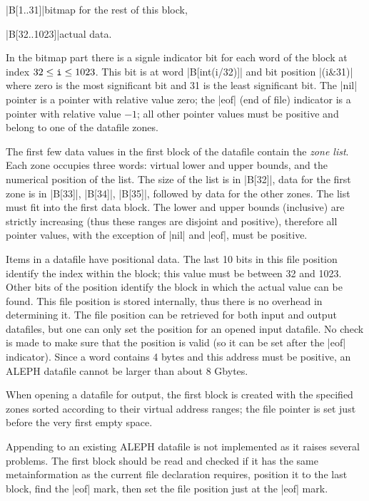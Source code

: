 \documentclass[titlepage]{article}
\newcommand\A{\textsf{ALEPH}}
\begin{document}
\HH\pp|B[1..31]|\HE bitmap for the rest of this block,

\HH\pp|B[32..1023]|\HE actual data.

\smallskip

\noindent
In the bitmap part there is a signle indicator bit for each word of the
block at index
$32\le \mbox{\tt i} \le 1023$. This bit is at word \pp|B[int(i/32)]| and
bit position \pp|(i\&31)| where zero is the most significant bit and 31 is the
least significant bit. The \pp|nil| pointer is a pointer with relative value
zero; the \pp|eof| (end of file) indicator is a pointer with relative value
$-1$; all other pointer values must be positive and belong to one of the
datafile zones.

The first few data values in the first block of the datafile contain the
\emph{zone list}. Each zone occupies three words: virtual lower and upper
bounds, and the numerical position of the list. The size of the list is in
\pp|B[32]|, data for the first zone is in \pp|B[33]|, \pp|B[34]|,
\pp|B[35]|, followed by data for the other zones. The list must fit into the
first data block. The lower and upper bounds (inclusive) are strictly
increasing (thus these ranges are disjoint and positive), therefore all
pointer values, with the exception of \pp|nil| and \pp|eof|, must be
positive.

Items in a datafile have positional data. The last 10 bits in this
file position identify the index within the block; this value must be
between 32 and 1023. Other bits of the position identify the block in which
the actual value can be found. This file position is stored internally, thus
there is no overhead in determining it. The file position can be retrieved for
both input and output datafiles, but one can only set the position for an
opened input datafile. No check is made to make sure that the position is
valid (so it can be set after the \pp|eof| indicator). Since a word contains
4 bytes and this address must be positive, an \A{} datafile cannot be larger
than about 8 Gbytes.

When opening a datafile for output, the first block is created with the 
specified zones sorted according to their virtual address ranges; the
file pointer is set just before the very first empty space.

Appending to an existing \A{} datafile is not implemented as it raises
several problems. The first block should be read and checked if it has the
same metainformation as the current file declaration requires, position it
to the last block, find the \pp|eof| mark, then set the file position just
at the \pp|eof| mark.
\end{document}
